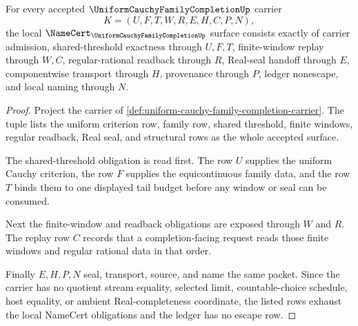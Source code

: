 \begin{theorem}
\label{thm:uniform-cauchy-family-completion-namecert-obligations}
For every accepted $\UniformCauchyFamilyCompletionUp$ carrier
$$
K=(U,F,T,W,R,E,H,C,P,N),
$$
the local $\NameCert_{\UniformCauchyFamilyCompletionUp}$ surface consists exactly of carrier admission, shared-threshold exactness through $U,F,T$, finite-window replay through $W,C$, regular-rational readback through $R$, Real-seal handoff through $E$, componentwise transport through $H$, provenance through $P$, ledger nonescape, and local naming through $N$.
\end{theorem}
\begin{proof}
Project the carrier of \autoref{def:uniform-cauchy-family-completion-carrier}. The tuple lists the uniform criterion row, family row, shared threshold, finite windows, regular readback, Real seal, and structural rows as the whole accepted surface.

The shared-threshold obligation is read first. The row $U$ supplies the uniform Cauchy criterion, the row $F$ supplies the equicontinuous family data, and the row $T$ binds them to one displayed tail budget before any window or seal can be consumed.

Next the finite-window and readback obligations are exposed through $W$ and $R$. The replay row $C$ records that a completion-facing request reads those finite windows and regular rational data in that order.

Finally $E,H,P,N$ seal, transport, source, and name the same packet. Since the carrier has no quotient stream equality, selected limit, countable-choice schedule, host equality, or ambient Real-completeness coordinate, the listed rows exhaust the local NameCert obligations and the ledger has no escape row.
\end{proof}

